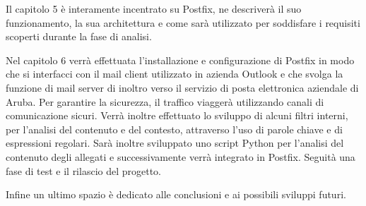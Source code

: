 Il capitolo 5 è interamente incentrato su Postfix, ne descriverà il suo funzionamento, 
la sua architettura e come sarà utilizzato per soddisfare i requisiti scoperti durante la fase di analisi.

Nel capitolo 6 verrà effettuata l'installazione e configurazione di Postfix in modo che si interfacci con
il mail client utilizzato in azienda Outlook e che svolga la funzione di mail server di inoltro verso il servizio
di posta elettronica aziendale di Aruba.
Per garantire la sicurezza, il traffico viaggerà utilizzando canali di comunicazione sicuri.
Verrà inoltre effettuato lo sviluppo di alcuni filtri interni, per l'analisi del contenuto e del contesto,
attraverso l'uso di parole chiave e di espressioni regolari.
Sarà inoltre sviluppato uno script Python per l'analisi del contenuto degli allegati e successivamente verrà
integrato in Postfix. Seguità una fase di test e il rilascio del progetto. 

Infine un ultimo spazio è dedicato alle conclusioni e ai possibili sviluppi futuri.




